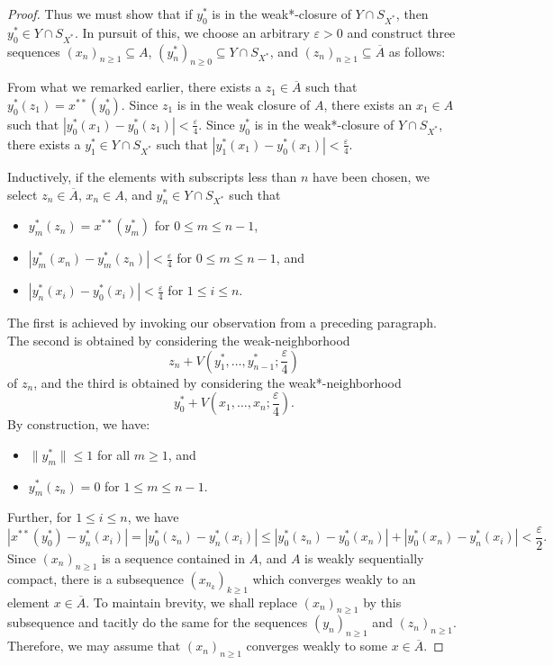 \documentclass[11pt]{article}
\theoremstyle{thmstyle}
\theoremstyle{defstyle}
\renewcommand{\le}{\leqslant}
\renewcommand{\ge}{\geqslant}
\begin{document}
\begin{proof}
    Thus we must show that if $y_0^\ast$ is in the weak*-closure of $Y\cap S_{X^\ast}$, then $y_0^\ast\in Y\cap S_{X^\ast}$. In pursuit of this, we choose an arbitrary $\varepsilon > 0$ and construct three sequences $(x_n)_{n\ge 1}\subseteq A$, $(y_n^\ast)_{n\ge 0}\subseteq Y\cap S_{X^\ast}$, and $(z_n)_{n\ge 1}\subseteq\overline A$ as follows:

    From what we remarked earlier, there exists a $z_1\in\overline A$ such that $y_0^\ast(z_1) = x^{\ast\ast}(y_0^\ast)$. Since $z_1$ is in the weak closure of $A$, there exists an $x_1\in A$ such that $|y_0^\ast(x_1) - y_0^\ast(z_1)| < \frac{\varepsilon}{4}$. Since $y_0^\ast$ is in the weak*-closure of $Y\cap S_{X^\ast}$, there exists a $y_1^\ast\in Y\cap S_{X^\ast}$ such that $|y_1^\ast(x_1) - y_0^\ast(x_1)| < \frac{\varepsilon}{4}$.

    Inductively, if the elements with subscripts less than $n$ have been chosen, we select $z_n\in\overline A$, $x_n\in A$, and $y_n^\ast\in Y\cap S_{X^\ast}$ such that 
    \begin{itemize}
        \item $y_m^\ast(z_n) = x^{\ast\ast}(y_m^\ast)$ for $0\le m\le n - 1$, 
        \item $|y_m^{\ast}(x_n) - y_m^{\ast}(z_n)| < \frac{\varepsilon}{4}$ for $0\le m\le n - 1$, and 
        \item $|y_n^\ast(x_i) - y_0^{\ast}(x_i)| < \frac{\varepsilon}{4}$ for $1\le i\le n$.
    \end{itemize}
    The first is achieved by invoking our observation from a preceding paragraph. The second is obtained by considering the weak-neighborhood 
    \begin{equation*}
        z_n + V\left(y_1^\ast,\dots, y_{n - 1}^\ast; \frac{\varepsilon}{4}\right)
    \end{equation*}
    of $z_n$, and the third is obtained by considering the weak*-neighborhood
    \begin{equation*}
        y_0^\ast + V\left(x_1,\dots, x_n; \frac{\varepsilon}{4}\right).
    \end{equation*}
    By construction, we have: 
    \begin{itemize}
        \item $\|y_m^\ast\|\le 1$ for all $m\ge 1$, and 
        \item $y_m^\ast(z_n) = 0$ for $1\le m\le n - 1$.
    \end{itemize}
    Further, for $1\le i\le n$, we have 
    \begin{equation*}
        |x^{\ast\ast}(y_0^\ast) - y_n^\ast(x_i)| = |y_0^{\ast}(z_n) - y_n^{\ast}(x_i)|\le |y_0^\ast(z_n) - y_0^\ast(x_n)| + |y_0^\ast(x_n) - y_n^\ast(x_i)| < \frac{\varepsilon}{2}.
    \end{equation*}
    Since $(x_n)_{n\ge 1}$ is a sequence contained in $A$, and $A$ is weakly sequentially compact, there is a subsequence $(x_{n_k})_{k\ge 1}$ which converges weakly to an element $x\in\overline A$. To maintain brevity, we shall replace $(x_n)_{n\ge 1}$ by this subsequence and tacitly do the same for the sequences $(y_n)_{n\ge 1}$ and $(z_n)_{n\ge 1}$. Therefore, we may assume that $(x_n)_{n\ge 1}$ converges weakly to some $x\in\overline A$. 


\end{proof}
\end{document}
